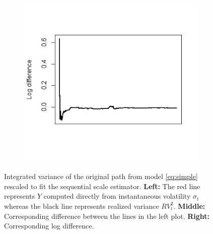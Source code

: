 \documentclass{article}
\begin{document}
\begin{figure}[h]
\begin{subfigure}{0.32\textwidth}
    \end{subfigure}\hfill
    \begin{subfigure}{0.32\textwidth}
        \centering
        \includegraphics[width=\textwidth]{ex5_scale3.jpeg}
    \end{subfigure}
    \caption{Integrated variance of the original path from model \eqref{eq:simple} rescaled to fit the sequential scale estimator. \textbf{Left:} The red line represents $Y$ computed directly from instantaneous volatility $\sigma_t$ whereas the black line represents realized variance $RV_t^2$. \textbf{Middle:} Corresponding difference between the lines in the left plot. \textbf{Right:} Corresponding log difference.}
    \label{fig:ex5scale}
\end{figure}\\\\
\end{document}
